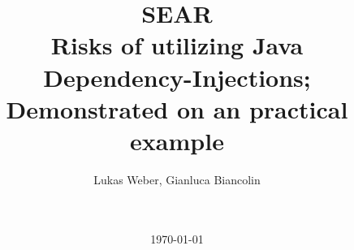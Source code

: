 \title{SEAR \\ Risks of utilizing Java Dependency-Injections; Demonstrated on an practical example}


\author{
    Lukas Weber, Gianluca Biancolin \\
    \\
    \\
}

\date{\today}

\maketitle

\thispagestyle{empty}

\clearpage